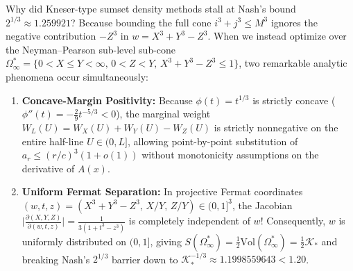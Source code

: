 \documentclass[11pt,a4paper]{article}
\theoremstyle{remark}
\begin{document}
\begin{archbox}
Why did Kneser-type sumset density methods stall at Nash's bound $2^{1/3} \approx 1.259921$? Because bounding the full cone $i^3 + j^3 \le M^3$ ignores the negative contribution $-Z^3$ in $w = X^3 + Y^3 - Z^3$. When we instead optimize over the Neyman--Pearson sub-level sub-cone $\Omega_\infty^* = \{0 < X \le Y < \infty,\, 0 < Z < Y,\, X^3 + Y^3 - Z^3 \le 1\}$, two remarkable analytic phenomena occur simultaneously:
\begin{enumerate}
  \item \textbf{Concave-Margin Positivity:} Because $\phi(t) = t^{1/3}$ is strictly concave ($\phi''(t) = -\frac{2}{9}t^{-5/3} < 0$), the marginal weight $W_L(U) = W_X(U) + W_Y(U) - W_Z(U)$ is strictly nonnegative on the entire half-line $U \in (0, L]$, allowing point-by-point substitution of $a_r \le (r/c)^3(1+o(1))$ without monotonicity assumptions on the derivative of $A(x)$.
  \item \textbf{Uniform Fermat Separation:} In projective Fermat coordinates $(w, t, z) = (X^3 + Y^3 - Z^3,\, X/Y,\, Z/Y) \in (0, 1]^3$, the Jacobian $\bigl|\frac{\partial(X,Y,Z)}{\partial(w,t,z)}\bigr| = \frac{1}{3(1 + t^3 - z^3)}$ is completely independent of $w$! Consequently, $w$ is uniformly distributed on $(0, 1]$, giving $S(\Omega_\infty^*) = \frac{1}{2}\mathrm{Vol}(\Omega_\infty^*) = \frac{1}{2}\mathcal{K}_*$ and breaking Nash's $2^{1/3}$ barrier down to $\mathcal{K}_*^{-1/3} \approx 1.1998559643 < 1.20$.
\end{enumerate}
\end{archbox}
\end{document}
